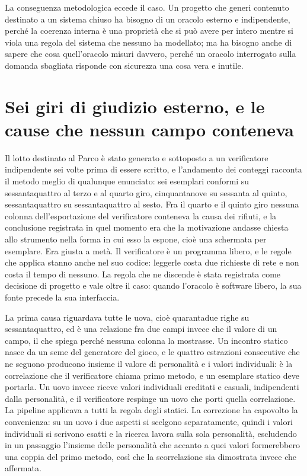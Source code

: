 La conseguenza metodologica eccede il caso. Un progetto che generi contenuto destinato a un sistema chiuso ha bisogno di un oracolo esterno e indipendente, perché la coerenza interna è una proprietà che si può avere per intero mentre si viola una regola del sistema che nessuno ha modellato; ma ha bisogno anche di sapere che cosa quell'oracolo misuri davvero, perché un oracolo interrogato sulla domanda sbagliata risponde con sicurezza una cosa vera e inutile.

\section{Sei giri di giudizio esterno, e le cause che nessun campo conteneva}

Il lotto destinato al Parco è stato generato e sottoposto a un verificatore indipendente sei volte prima di essere scritto, e l'andamento dei conteggi racconta il metodo meglio di qualunque enunciato: sei esemplari conformi su sessantaquattro al terzo e al quarto giro, cinquantanove su sessanta al quinto, sessantaquattro su sessantaquattro al sesto. Fra il quarto e il quinto giro nessuna colonna dell'esportazione del verificatore conteneva la causa dei rifiuti, e la conclusione registrata in quel momento era che la motivazione andasse chiesta allo strumento nella forma in cui esso la espone, cioè una schermata per esemplare. Era giusta a metà. Il verificatore è un programma libero, e le regole che applica stanno anche nel suo codice: leggerle costa due richieste di rete e non costa il tempo di nessuno. La regola che ne discende è stata registrata come decisione di progetto e vale oltre il caso: quando l'oracolo è software libero, la sua fonte precede la sua interfaccia.

La prima causa riguardava tutte le uova, cioè quarantadue righe su sessantaquattro, ed è una relazione fra due campi invece che il valore di un campo, il che spiega perché nessuna colonna la mostrasse. Un incontro statico nasce da un seme del generatore del gioco, e le quattro estrazioni consecutive che ne seguono producono insieme il valore di personalità e i valori individuali: è la correlazione che il verificatore chiama primo metodo, e un esemplare statico deve portarla. Un uovo invece riceve valori individuali ereditati e casuali, indipendenti dalla personalità, e il verificatore respinge un uovo che porti quella correlazione. La pipeline applicava a tutti la regola degli statici. La correzione ha capovolto la convenienza: su un uovo i due aspetti si scelgono separatamente, quindi i valori individuali si scrivono esatti e la ricerca lavora sulla sola personalità, escludendo in un passaggio l'insieme delle personalità che accanto a quei valori formerebbero una coppia del primo metodo, così che la scorrelazione sia dimostrata invece che affermata.

